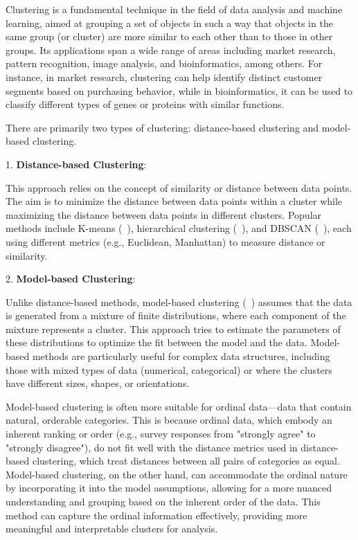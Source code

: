 \documentclass{article}
\begin{document}
Clustering is a fundamental technique in the field of data analysis and machine learning, aimed at grouping a set of objects in such a way that objects in the same group (or cluster) are more similar to each other than to those in other groups. Its applications span a wide range of areas including market research, pattern recognition, image analysis, and bioinformatics, among others. For instance, in market research, clustering can help identify distinct customer segments based on purchasing behavior, while in bioinformatics, it can be used to classify different types of genes or proteins with similar functions.

There are primarily two types of clustering: distance-based clustering and model-based clustering.

1. \textbf{Distance-based Clustering}: 

This approach relies on the concept of similarity or distance between data points. 
The aim is to minimize the distance between data points within a cluster while maximizing the distance between data points in different clusters. 
Popular methods include K-means (~\cite{macqueen1967some}), 
hierarchical clustering (~\cite{johnson1967hierarchical}), and DBSCAN (~\cite{ester1996density}), 
each using different metrics (e.g., Euclidean, Manhattan) to measure distance or similarity.

2. \textbf{Model-based Clustering}: 

Unlike distance-based methods, model-based clustering (~\cite{fraley2002model}) assumes that the data is generated from a mixture of finite distributions, 
where each component of the mixture represents a cluster. 
This approach tries to estimate the parameters of these distributions to optimize the fit between the model and the data. 
Model-based methods are particularly useful for complex data structures, including those with mixed types of data (numerical, categorical) or where the clusters have different sizes, shapes, or orientations.

Model-based clustering is often more suitable for ordinal data—data that contain natural, orderable categories. This is because ordinal data, which embody an inherent ranking or order (e.g., survey responses from "strongly agree" to "strongly disagree"), do not fit well with the distance metrics used in distance-based clustering, which treat distances between all pairs of categories as equal. Model-based clustering, on the other hand, can accommodate the ordinal nature by incorporating it into the model assumptions, allowing for a more nuanced understanding and grouping based on the inherent order of the data. This method can capture the ordinal information effectively, providing more meaningful and interpretable clusters for analysis.
\end{document}
